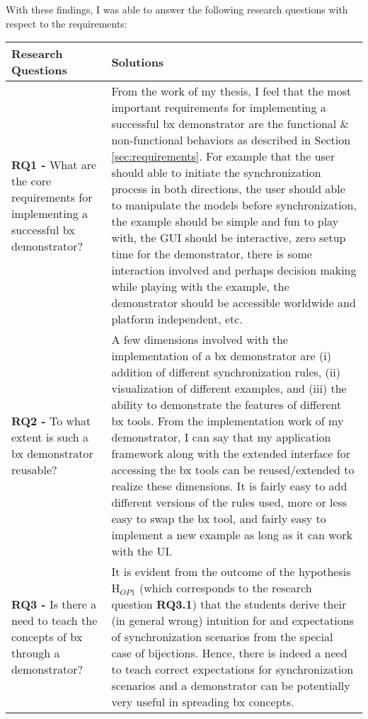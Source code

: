 With these findings, I was able to answer the following research questions with respect to the requirements:
\begin{table}[h]
	\begin{tabular}{|p{5cm}|p{9.5cm}|}
		\hline
		\rowcolor[gray]{.8}	
		\textbf{Research Questions} & \textbf{Solutions}\\
		\hline
		\textbf{RQ1 -} What are the core requirements for implementing a successful bx demonstrator? &
		From the work of my thesis, I feel that the most important requirements for implementing a successful bx demonstrator are the functional \& non-functional behaviors as described in Section \ref{sec:requirements}. For example that the user should able to initiate the synchronization process in both directions, the user should able to manipulate the models before synchronization, the example should be simple and fun to play with, the GUI should be interactive, zero setup time for the demonstrator, there is some interaction involved and perhaps decision making while playing with the example, the demonstrator should be accessible worldwide and platform independent, etc. \\
		\hline
		\textbf{RQ2 -} To what extent is such a bx demonstrator reusable? &
		A few dimensions involved with the implementation of a bx demonstrator are (i) addition of different synchronization rules, (ii) visualization of different examples, and (iii) the ability to demonstrate the features of different bx tools. From the implementation work of my demonstrator, I can say that my application framework along with the extended interface for accessing the bx tools can be reused/extended to realize these dimensions. It is fairly easy to add different versions of the rules used, more or less easy to swap the bx tool, and fairly easy to implement a new example as long as it can work with the UI.\\
		\hline
		\textbf{RQ3 -} Is there a need to teach the concepts of bx through a demonstrator? &
		It is evident from the outcome of the hypothesis H$_{OP1}$ (which corresponds to the research question \textbf{RQ3.1}) that the students derive their (in general wrong) intuition for and expectations of synchronization scenarios from the special case of bijections. Hence, there is indeed a need to teach correct expectations for synchronization scenarios and a demonstrator can be potentially very useful in spreading bx concepts.\\
		\hline				
	\end{tabular}
	\label{tab:Solutions_ResearchQuestions}
\end{table}

